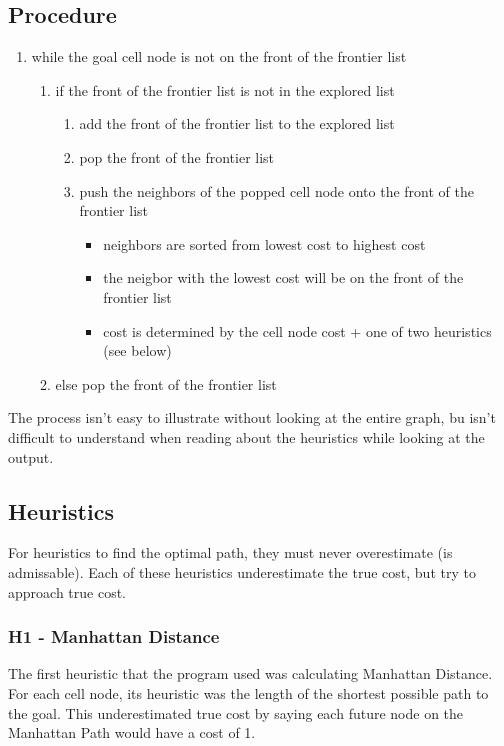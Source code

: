 \documentclass[12pt]{article}
\begin{document}
	\subsection{Procedure}
	\begin{enumerate}
		\item while the goal cell node is not on the front of the frontier list
		\begin{enumerate}
			\item if the front of the frontier list is not in the explored list
				\begin{enumerate}
					\item add the front of the frontier list to the explored list
					\item pop the front of the frontier list
					\item push the neighbors of the popped cell node onto the front of the frontier list
					\begin{itemize}
						\item neighbors are sorted from lowest cost to highest cost
						\item the neigbor with the lowest cost will be on the front of the frontier list
						\item cost is determined by the cell node cost + one of two heuristics (see below)
					\end{itemize}				
				\end{enumerate}
			\item else pop the front of the frontier list
		\end{enumerate}	
	\end{enumerate}

	The process isn't easy to illustrate without looking at the entire graph, bu isn't difficult to understand when reading about the heuristics while looking at the output.

	\subsection{Heuristics}
	For heuristics to find the optimal path, they must never overestimate (is admissable). Each of these heuristics underestimate the true cost, but try to approach true cost.
 
		\subsubsection{H1 - Manhattan Distance}
		The first heuristic that the program used was calculating Manhattan Distance. For each cell node, its heuristic was the length of the shortest possible path to the goal. This underestimated true cost by saying each future node on the Manhattan Path would have a cost of 1.
	
\end{document}
